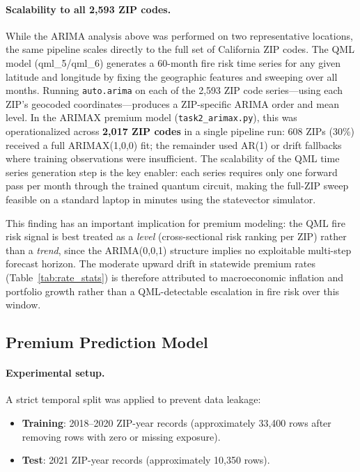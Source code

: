 \documentclass[11pt,a4paper]{article}
\begin{document}
\paragraph{Scalability to all 2,593 ZIP codes.}
While the ARIMA analysis above was performed on two representative locations,
the same pipeline scales directly to the full set of California ZIP codes.
The QML model (qml\_5/qml\_6) generates a 60-month fire risk time series for
any given latitude and longitude by fixing the geographic features and sweeping
over all months. Running \texttt{auto.arima} on each of the 2,593 ZIP code
series---using each ZIP's geocoded coordinates---produces a ZIP-specific
ARIMA order and mean level. In the ARIMAX premium model (\texttt{task2\_arimax.py}),
this was operationalized across \textbf{2,017 ZIP codes} in a single pipeline
run: 608 ZIPs (30\%) received a full ARIMAX(1,0,0) fit; the remainder used
AR(1) or drift fallbacks where training observations were insufficient.
The scalability of the QML time series generation step is the key enabler:
each series requires only one forward pass per month through the trained
quantum circuit, making the full-ZIP sweep feasible on a standard laptop
in minutes using the statevector simulator.

This finding has an important implication for premium modeling: the QML fire
risk signal is best treated as a \emph{level} (cross-sectional risk ranking per
ZIP) rather than a \emph{trend}, since the ARIMA(0,0,1) structure implies no
exploitable multi-step forecast horizon. The moderate upward drift in statewide
premium rates (Table~\ref{tab:rate_stats}) is therefore attributed to
macroeconomic inflation and portfolio growth rather than a QML-detectable
escalation in fire risk over this window.

\subsection{Premium Prediction Model}
\label{sec:premium_model}

\paragraph{Experimental setup.}
A strict temporal split was applied to prevent data leakage:
\begin{itemize}[leftmargin=*]
    \item \textbf{Training}: 2018--2020 ZIP-year records (approximately 33,400 rows after removing rows with zero or missing exposure).
    \item \textbf{Test}: 2021 ZIP-year records (approximately 10,350 rows).
\end{itemize}
\end{document}
